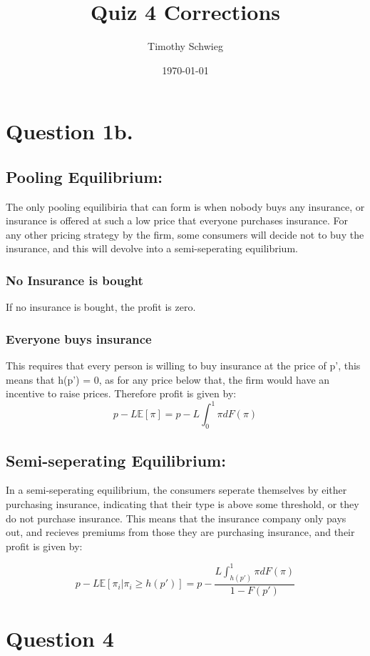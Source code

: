 \documentclass[11pt]{article}
\author{Timothy Schwieg}
\date{\today}
\title{Quiz 4 Corrections}
\begin{document}
\maketitle

\section{Question 1b.}
\label{sec-1}

\subsection{Pooling Equilibrium:}
\label{sec-1-1}
The only pooling equilibiria that can form is when nobody buys any
insurance, or insurance is offered at such a low price that everyone
purchases insurance. For any other pricing strategy by the firm, some
consumers will decide not to buy the insurance, and this will devolve
into a semi-seperating equilibrium. 

\subsubsection{No Insurance is bought}
\label{sec-1-1-1}
If no insurance is bought, the profit is zero.

\subsubsection{Everyone buys insurance}
\label{sec-1-1-2}
This requires that every person is willing to buy insurance at the
price of p', this means that h(p') = 0, as for any price below that,
the firm would have an incentive to raise prices. Therefore profit is
given by:
$$p - L \mathbb{E}[ \pi ] = p - L \int_0^1 \pi dF(\pi)$$


\subsection{Semi-seperating Equilibrium:}
\label{sec-1-2}
In a semi-seperating equilibrium, the consumers seperate themselves by
either purchasing insurance, indicating that their type is above some
threshold, or they do not purchase insurance. This means that the
insurance company only pays out, and recieves premiums from those they
are purchasing insurance, and their profit is given by: 

$$p - L \mathbb{E}[ \pi_i | \pi_i \geq h(p' ) ] = p - \frac{ L \int_{h(p')}^1 \pi
dF(\pi)}{1 - F(p')}$$


\section{Question 4}
\label{sec-2}
\end{document}
